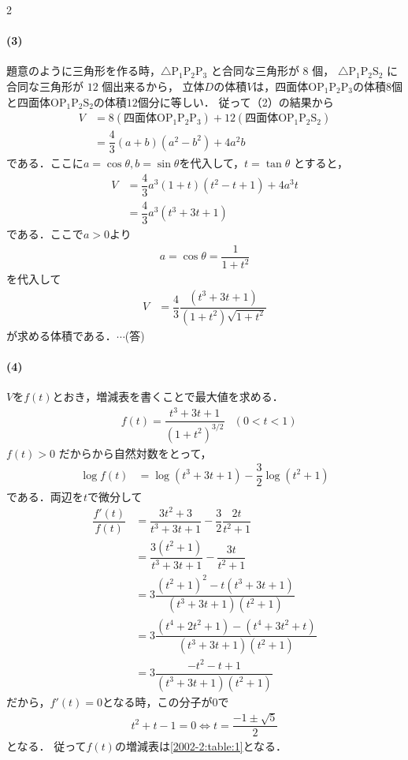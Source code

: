 \documentclass[../../main.tex]{subfiles}
\begin{document}
\begin{multicols}{2}
  \paragraph{(3)}
  題意のように三角形を作る時，$\triangle \text{P}_1\text{P}_2\text{P}_3$ と合同な三角形が $8$ 個，
  $\triangle \text{P}_1\text{P}_2\text{S}_2$ に合同な三角形が $12$ 個出来るから，
  立体$D$の体積$V$は，四面体$\text{O}\text{P}_1\text{P}_2\text{P}_3$の体積$8$個と四面体$\text{O}\text{P}_1\text{P}_2\text{S}_2$の体積$12$個分に等しい．
  従って（2）の結果から
  \begin{align}
    V & = 8(\text{四面体}\text{OP}_1\text{P}_2\text{P}_3) + 12(\text{四面体}\text{OP}_1\text{P}_2\text{S}_2) \\
    & = \dfrac{4}{3} (a+b)(a^2-b^2) + 4a^2b
  \end{align}
  である．ここに$a=\cos\theta,b=\sin\theta$を代入して，$t=\tan \theta$ とすると，
  \begin{align}
    V & = \dfrac{4}{3} a^3 (1+t)(t^2-t+1) + 4a^3t \\
    & = \dfrac{4}{3} a^3 \left(t^3+3t+1\right)
  \end{align}
  である．ここで$a>0$より
  \begin{align}
    a = \cos\theta = \dfrac{1}{1+t^2}
  \end{align}
  を代入して
  \begin{align}
    V
    & = \dfrac{4}{3} \dfrac{(t^3+3t+1)}{(1+t^2)\sqrt{1+t^2}}
  \end{align}
  が求める体積である．$\cdots$(答)

  \paragraph{(4)}
  $V$を$f(t)$とおき，増減表を書くことで最大値を求める．
  \begin{align}
    & f(t) = \dfrac{t^3+3t+1}{(1+t^2)^{3/2}} & (0<t<1)
  \end{align}
  $f(t)>0$ だからから自然対数をとって，
  \begin{align}
    \log f(t) & = \log (t^3+3t+1) - \dfrac{3}{2} \log (t^2+1)
  \end{align}
  である．両辺を$t$で微分して
  \begin{align}
    \dfrac{f'(t)}{f(t)}
    & = \dfrac{3t^2+3}{t^3+3t+1} - \dfrac{3}{2} \dfrac{2t}{t^2+1} \\
    & = \dfrac{3(t^2+1)}{t^3+3t+1} - \dfrac{3t}{t^2+1}           \\
    & = 3\dfrac{(t^2+1)^2 - t(t^3+3t+1)}{(t^3+3t+1)(t^2+1)}     \\
    & = 3\dfrac{(t^4+2t^2+1) - (t^4+3t^2+t)}{(t^3+3t+1)(t^2+1)} \\
    & = 3\dfrac{-t^2-t+1}{(t^3+3t+1)(t^2+1)}
  \end{align}
  だから，$f'(t)=0$となる時，この分子が$0$で
  \begin{align}
    t^2+t-1=0 \iff t=\dfrac{-1\pm\sqrt{5}}{2}
  \end{align}
  となる．
  従って$f(t)$の増減表は\cref{2002-2:table:1}となる．


\end{multicols}
\end{document}
